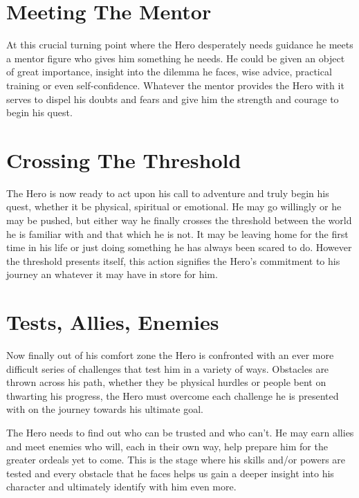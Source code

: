 \documentclass[oneside]{book}
\begin{document}
\newpage

\chapter{Meeting The Mentor}

At this crucial turning point where the Hero desperately needs guidance he meets a mentor figure who gives him something he needs. He could be given an object of great importance, insight into the dilemma he faces, wise advice, practical training or even self-confidence. Whatever the mentor provides the Hero with it serves to dispel his doubts and fears and give him the strength and courage to begin his quest.



\newpage

\chapter{Crossing The Threshold}

The Hero is now ready to act upon his call to adventure and truly begin his quest, whether it be physical, spiritual or emotional. He may go willingly or he may be pushed, but either way he finally crosses the threshold between the world he is familiar with and that which he is not. It may be leaving home for the first time in his life or just doing something he has always been scared to do. However the threshold presents itself, this action signifies the Hero's commitment to his journey an whatever it may have in store for him.



\newpage

\chapter{Tests, Allies, Enemies}

Now finally out of his comfort zone the Hero is confronted with an ever more difficult series of challenges that test him in a variety of ways. Obstacles are thrown across his path, whether they be physical hurdles or people bent on thwarting his progress, the Hero must overcome each challenge he is presented with on the journey towards his ultimate goal.

The Hero needs to find out who can be trusted and who can't. He may earn allies and meet enemies who will, each in their own way, help prepare him for the greater ordeals yet to come. This is the stage where his skills and/or powers are tested and every obstacle that he faces helps us gain a deeper insight into his character and ultimately identify with him even more.
\end{document}
